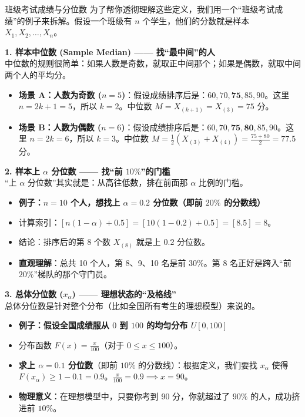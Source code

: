 \begin{example}{班级考试成绩与分位数}
为了帮你透彻理解这些定义，我们用一个“班级考试成绩”的例子来拆解。假设一个班级有 $n$ 个学生，他们的分数就是样本 $X_1, X_2, \dots, X_n$。

\textbf{1. 样本中位数 (Sample Median) —— 找“最中间”的人} \\
中位数的规则很简单：如果人数是奇数，就取正中间那个；如果是偶数，就取中间两个人的平均分。
\begin{itemize}
    \item \textbf{场景 A：人数为奇数 ($n=5$)}：假设成绩排序后是：$60, 70, \mathbf{75}, 85, 90$。这里 $n=2k+1=5$，所以 $k=2$。中位数 $M = X_{(k+1)} = X_{(3)} = 75$ 分。
    \item \textbf{场景 B：人数为偶数 ($n=6$)}：假设成绩排序后是：$60, 70, \mathbf{75, 80}, 85, 90$。这里 $n=2k=6$，所以 $k=3$。中位数 $M = \frac{1}{2}(X_{(3)} + X_{(4)}) = \frac{75+80}{2} = 77.5$ 分。
\end{itemize}

\textbf{2. 样本上 $\alpha$ 分位数 —— 找“前 $10\%$”的门槛} \\
“上 $\alpha$ 分位数”其实就是：从高往低数，排在前面那 $\alpha$ 比例的门槛。
\begin{itemize}
    \item \textbf{例子：$n=10$ 个人，想找上 $\alpha = 0.2$ 分位数（即前 $20\%$ 的分数线）}
    \item 计算索引：$[n(1-\alpha)+0.5] = [10(1-0.2)+0.5] = [8.5] = 8$。
    \item 结论：排序后的第 8 个数 $X_{(8)}$ 就是上 $0.2$ 分位数。
    \item \textbf{直观理解}：总共 10 个人，第 8、9、10 名是前 $30\%$。第 8 名正好是跨入“前 $20\%$”梯队的那个守门员。
\end{itemize}

\textbf{3. 总体分位数 ($x_\alpha$) —— 理想状态的“及格线”} \\
总体分位数是针对整个分布（比如全国所有考生的理想模型）来说的。
\begin{itemize}
    \item \textbf{例子：假设全国成绩服从 $0$ 到 $100$ 的均匀分布 $U[0, 100]$}
    \item 分布函数 $F(x) = \frac{x}{100}$（对于 $0 \le x \le 100$）。
    \item \textbf{求上 $\alpha=0.1$ 分位数}（即前 $10\%$ 的分数线）：根据定义，我们要找 $x_\alpha$ 使得 $F(x_\alpha) \geqslant 1 - 0.1 = 0.9$。$\frac{x}{100} = 0.9 \implies x = 90$。
    \item \textbf{物理意义}：在理想模型中，只要你考到 90 分，你就超过了 $90\%$ 的人，成功挤进前 $10\%$。
\end{itemize}


\end{example}
